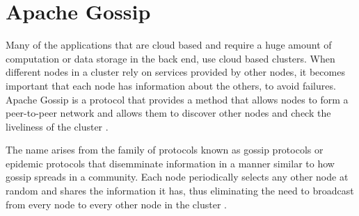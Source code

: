 \section{Apache Gossip}

Many of the applications that are cloud based and require a huge amount of
computation or data storage in the back end, use cloud based clusters. When
different nodes in a cluster rely on services provided by other nodes, it
becomes important that each node has information about the others, to avoid
failures. Apache Gossip is a protocol that provides a method that allows
nodes to form a peer-to-peer network and allows them to discover other
nodes and check the liveliness of the cluster
\cite{hid-sp18-503-www-gossip}.

The name arises from the family of protocols known as gossip protocols or
epidemic protocols that disemminate information in a manner similar to how
gossip spreads in a community. Each node periodically selects any other
node at random and shares the information it has, thus eliminating the need
to broadcast from every node to every other node in the cluster
\cite{hid-sp18-503-www-gossip-wiki}.
